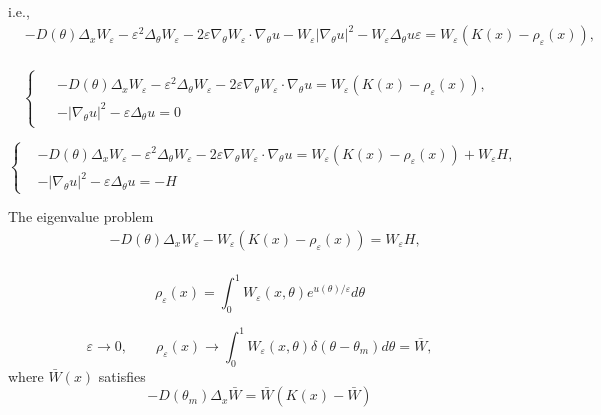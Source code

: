 \documentclass[preprint]{article}
\numberwithin{equation}{section}
\begin{document}
i.e.,
\begin{equation}
\begin{aligned}
&-D(\theta)\Delta_x W_\varepsilon -\varepsilon^2\Delta_\theta W_\varepsilon - 2\varepsilon\nabla_\theta W_\varepsilon\cdot \nabla_\theta u - W_\varepsilon |\nabla_\theta u|^2 - W_\varepsilon \Delta_\theta u\varepsilon= W_\varepsilon (K(x)-\rho_\varepsilon(x)),\\
\end{aligned}
\end{equation}

\begin{equation}
\begin{cases}
\begin{aligned}
&-D(\theta)\Delta_x W_\varepsilon -\varepsilon^2\Delta_\theta W_\varepsilon - 2\varepsilon\nabla_\theta W_\varepsilon\cdot \nabla_\theta u = W_\varepsilon (K(x)-\rho_\varepsilon(x)),\\
& - |\nabla_\theta u|^2 - \varepsilon \Delta_\theta u=0
\end{aligned}
\end{cases}
\end{equation}

\begin{equation}
\left\{
\begin{aligned}
&-D(\theta)\Delta_x W_\varepsilon -\varepsilon^2\Delta_\theta W_\varepsilon - 2\varepsilon\nabla_\theta W_\varepsilon\cdot \nabla_\theta u = W_\varepsilon (K(x)-\rho_\varepsilon(x)) + W_\varepsilon H,\\
& - |\nabla_\theta u|^2 - \varepsilon \Delta_\theta u= -H
\end{aligned}
\right.
\end{equation}

The eigenvalue problem
\begin{equation}
\begin{aligned}
&-D(\theta)\Delta_x W_\varepsilon - W_\varepsilon (K(x)-\rho_\varepsilon(x)) = W_\varepsilon H,\\
\end{aligned}
\end{equation}

\begin{equation}
\rho_\varepsilon(x) = \int_0^1 W_\varepsilon(x,\theta) e^{u(\theta)/\varepsilon} d\theta
\end{equation}

\begin{equation}
\varepsilon \to 0, \qquad \rho_\varepsilon(x) \to \int_0^1 W_\varepsilon(x,\theta) \delta(\theta-\theta_m) d\theta = \bar{W},
\end{equation}
where $\bar{W}(x)$ satisfies
$$-D(\theta_m) \Delta_x \bar{W}=\bar{W}(K(x)-\bar{W})$$
\end{document}
